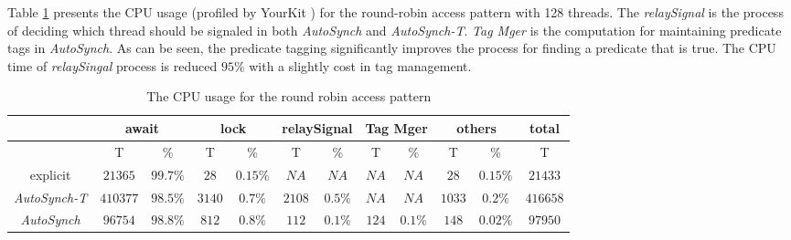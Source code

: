 \documentclass[preprint]{sigplanconf}
\begin{document}
Table \ref{tab:cpu} presents the CPU usage (profiled by YourKit \cite{yourkit}) 
for the round-robin access pattern with 128 threads. The {\em relaySignal} is the
process of deciding which thread should be signaled in both {\em AutoSynch} and
{\em AutoSynch-T}. {\em Tag Mger} is the computation for
maintaining predicate tags in {\em AutoSynch}. 
As can be seen, the 
predicate tagging significantly improves the process for finding a predicate 
that is true. The CPU time of {\em relaySingal} process is reduced $95\%$ with
a slightly cost in tag management. 

\begin{table}[ht!]
   \centering
   \begin{tabular}{|c||c|c||c|c||c|c||c|c|c|c|c|}
      \hline 
      & \multicolumn{2}{c||}{await} & \multicolumn{2}{c||}{lock} & 
        \multicolumn{2}{c||}{relaySignal} & \multicolumn{2}{c|}{Tag Mger} &
        \multicolumn{2}{c|}{others} & total \\
      \hline
         & T & \% & T & \% & T & \% & T & \% & T & \% & T \\
      \hline 
      \hline 
      explicit & $21365$ & $99.7\%$ & $28$ & $0.15\%$ & $NA$ & $NA$ & $NA$ &
      $NA$  & $28$ & $0.15\%$ & $21433$ \\
      \hline 
      {\em AutoSynch-T} & $410377$ & $98.5\%$ & $3140$ & $0.7\%$ & $2108$ & $0.5\%$
      & $NA$ & $NA$ & $1033$ & $0.2\%$ & $416658$\\
      \hline 
      {\em AutoSynch} & $96754$ & $98.8\%$ & $812$ & $0.8\%$ & $112$ & $0.1\%$ & 
      $124$ & $0.1\%$ & $148$ & $0.02\%$ & $97950$\\
      \hline 
   \end{tabular}
   \caption{The CPU usage for the round robin access pattern}
   \label{tab:cpu}
\end{table}
\end{document}
